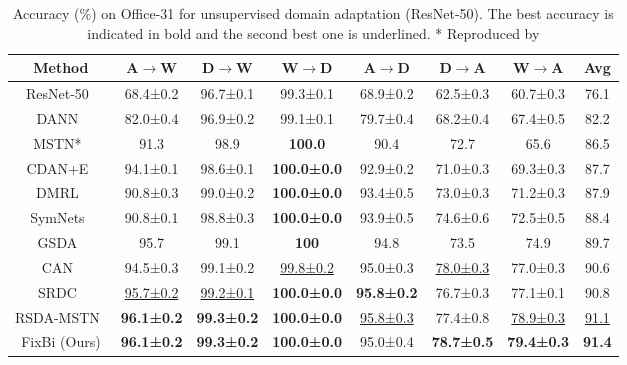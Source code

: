 \documentclass[final]{cvpr}
\begin{document}
\begin{table*}[h!]
\begin{center}
\caption{Accuracy (\%) on Office-31 for unsupervised domain adaptation (ResNet-50). The best accuracy is indicated in bold and the second best one is underlined. * Reproduced by \cite{DSBN}}
\label{tab:Office-31}
\begin{tabular}{ccccccc|c}
\hline
Method       & A$\rightarrow$W & D$\rightarrow$W & W$\rightarrow$D & A$\rightarrow$D & D$\rightarrow$A & W$\rightarrow$A                    & Avg          \\ 
\hline\hline
ResNet-50~\cite{ResNet1} & 68.4±0.2          & 96.7±0.1       & 99.3±0.1           & 68.9±0.2          & 62.5±0.3 & \multicolumn{1}{c|}{60.7±0.3} & 76.1 \\
DANN~\cite{Ganin2015}   & 82.0±0.4          & 96.9±0.2       & 99.1±0.1           & 79.7±0.4          & 68.2±0.4 & \multicolumn{1}{c|}{67.4±0.5} & 82.2 \\
MSTN*~\cite{MSTN}      & 91.3              & 98.9           & \textbf{100.0}     & 90.4              & 72.7     & \multicolumn{1}{c|}{65.6}     & 86.5 \\
CDAN+E~\cite{CDAN}      & 94.1±0.1          & 98.6±0.1       & \textbf{100.0±0.0} & 92.9±0.2          & 71.0±0.3 & \multicolumn{1}{c|}{69.3±0.3} & 87.7 \\
DMRL~\cite{Wu2020}      & 90.8±0.3          & 99.0±0.2       & \textbf{100.0±0.0} & 93.4±0.5          & 73.0±0.3 & \multicolumn{1}{c|}{71.2±0.3} & 87.9 \\
SymNets~\cite{SymNets}   & 90.8±0.1          & 98.8±0.3       & \textbf{100.0±0.0} & 93.9±0.5          & 74.6±0.6 & \multicolumn{1}{c|}{72.5±0.5} & 88.4 \\
GSDA~\cite{GSDA}      & 95.7              & 99.1           & \textbf{100}       & 94.8              & 73.5     & \multicolumn{1}{c|}{74.9}     & 89.7 \\
CAN~\cite{CAN2019}       & 94.5±0.3          & 99.1±0.2       & \underline{99.8±0.2}           & 95.0±0.3          & \underline{78.0±0.3} & \multicolumn{1}{c|}{77.0±0.3} & 90.6 \\
SRDC~\cite{SRDC}      & \underline{95.7±0.2}          & \underline{99.2±0.1}       & \textbf{100.0±0.0}     & \textbf{95.8±0.2}          & 76.7±0.3 & \multicolumn{1}{c|}{77.1±0.1} & 90.8 \\
RSDA-MSTN~\cite{Gu2020} & \textbf{96.1±0.2} & \textbf{99.3±0.2}       & \textbf{100.0±0.0}       & \underline{95.8±0.3}          & 77.4±0.8 & \multicolumn{1}{c|}{\underline{78.9±0.3}} & \underline{91.1} \\ \hline
FixBi (Ours) &\textbf{96.1±0.2}            & \textbf{99.3±0.2}            & \textbf{100.0±0.0}  & 95.0±0.4            & \textbf{78.7±0.5}   & \multicolumn{1}{c|}{{\textbf{79.4±0.3}}} & \textbf{91.4} \\ \hline
\end{tabular}
\end{center}
\end{table*}
\end{document}
